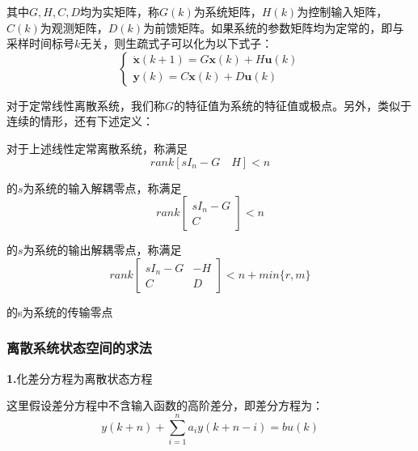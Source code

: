 其中$G,H,C,D$均为实矩阵，称$G(k)$为系统矩阵，$H(k)$为控制输入矩阵，$C(k)$为观测矩阵，$D(k)$为前馈矩阵。如果系统的参数矩阵均为定常的，即与采样时间标号$k$无关，则生疏式子可以化为以下式子：
\begin{equation*}
    \begin{cases}
        \dot{\bm{x}}(k+1) = G\bm{x}(k) + H \bm{u}(k)\\
        \bm{y}(k) = C \bm{x}(k) + D \bm{u}(k)
    \end{cases}
\end{equation*}

对于定常线性离散系统，我们称$G$的特征值为系统的特征值或极点。另外，类似于连续的情形，还有下述定义：
\begin{definition}
    对于上述线性定常离散系统，称满足
    \begin{equation*}
        rank[sI_n - G \quad H] < n
    \end{equation*}

    的$s$为系统的输入解耦零点，称满足
    \begin{equation*}
        rank \left[
            \begin{array}{c}
                sI_n - G \\    C
            \end{array}
        \right] <n
    \end{equation*}

    的$s$为系统的输出解耦零点，称满足
    \begin{equation*}
        rank \left[
            \begin{array}{cc}
                sI_n - G & -H \\
                C & D 
            \end{array}
        \right] < n+ min \{r,m\}
    \end{equation*}

    的s为系统的传输零点
\end{definition}

\subsubsection{离散系统状态空间的求法}

\noindent \textbf{1.}化差分方程为离散状态方程

这里假设差分方程中不含输入函数的高阶差分，即差分方程为：
\begin{equation*}
    y(k+n) + \sum_{i=1}^n a_i y(k+n-i) = b u(k)
\end{equation*}

